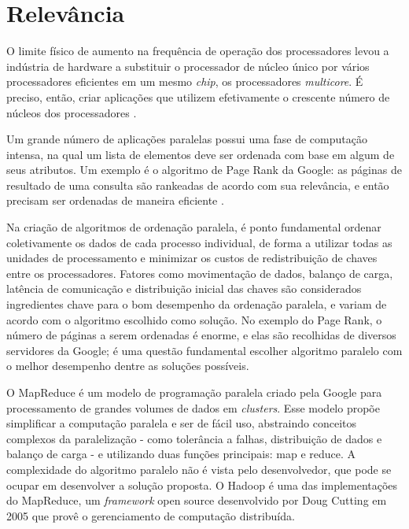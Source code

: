 \section{Relevância}



O limite físico de aumento na frequência de operação dos processadores levou a indústria de hardware a substituir o processador de núcleo único por vários processadores eficientes em um mesmo \textit{chip}, os processadores \textit{multicore}. 
É preciso, então, criar aplicações que utilizem efetivamente o crescente número de núcleos dos processadores  \cite{Asanovic:2009}.



Um grande número de aplicações paralelas possui uma fase de computação intensa, na qual um lista de elementos deve ser ordenada com base em algum de seus atributos. Um exemplo é o algoritmo de Page Rank \cite{PageRank:1999} da Google: as páginas de resultado de uma consulta são rankeadas de acordo com sua relevância, e então precisam ser ordenadas de maneira eficiente \cite{Kale:2010}.

Na criação de algoritmos de ordenação paralela, é ponto fundamental ordenar coletivamente os dados de cada processo individual, de forma a utilizar todas as unidades de processamento e minimizar os custos de redistribuição de chaves entre os processadores. Fatores como movimentação de dados, balanço de carga, latência de comunicação e distribuição inicial das chaves são considerados ingredientes chave para o bom desempenho da ordenação paralela, e variam de acordo com o algoritmo escolhido como solução\cite{Kale:2010}. 
No exemplo do Page Rank, o número de páginas a serem ordenadas é enorme, e elas são recolhidas de diversos servidores da Google; é uma questão fundamental escolher algoritmo paralelo com o melhor desempenho dentre as soluções possíveis.


O MapReduce\cite{Dean:2008}  é um modelo de programação paralela criado pela Google para processamento de grandes volumes de dados em \textit{clusters}. Esse modelo propõe simplificar a computação paralela e ser de fácil uso, abstraindo conceitos complexos da paralelização - como tolerância a falhas, distribuição de dados e balanço de carga - e utilizando duas funções principais: map e reduce. A complexidade do algoritmo paralelo não é vista pelo desenvolvedor, que pode se ocupar em desenvolver a solução proposta. O Hadoop \cite{Hadoop:2010} é uma das implementações do MapReduce, um \textit{framework} open source  desenvolvido por Doug Cutting em 2005 que provê o gerenciamento de computação distribuída. %

